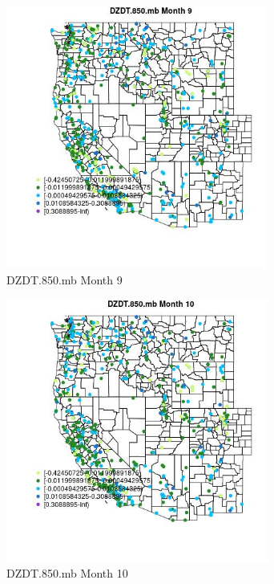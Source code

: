 \begin{figure} 
\centering  
\includegraphics[width=0.77\textwidth]{Code_Outputs/Report_ML_input_PM25_Step4_part_e_de_duplicated_aves_compiled_2019-05-14wNAs_MapObsMo9DZDT850mb.jpg} 
\caption{\label{fig:Report_ML_input_PM25_Step4_part_e_de_duplicated_aves_compiled_2019-05-14wNAsMapObsMo9DZDT850mb}DZDT.850.mb Month 9} 
\end{figure} 
 

\begin{figure} 
\centering  
\includegraphics[width=0.77\textwidth]{Code_Outputs/Report_ML_input_PM25_Step4_part_e_de_duplicated_aves_compiled_2019-05-14wNAs_MapObsMo10DZDT850mb.jpg} 
\caption{\label{fig:Report_ML_input_PM25_Step4_part_e_de_duplicated_aves_compiled_2019-05-14wNAsMapObsMo10DZDT850mb}DZDT.850.mb Month 10} 
\end{figure} 
 

